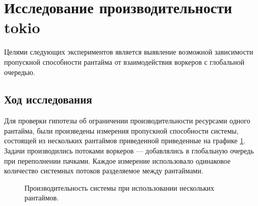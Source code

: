 
\section{Исследование производительности tokio}

Целями следующих экспериментов является выявление возможной зависимости пропускной способности рантайма от взаимодействия воркеров с глобальной очередью.

\subsection{Ход исследования}

Для проверки гипотезы об ограничении производительности ресурсами одного рантайма, были произведены измерения пропускной способности системы, состоящей из нескольких рантаймов приведенной приведенные на графике \ref{fig:tatlin:multi_rt:eval}. Задачи производились потоками воркеров --- добавлялись в глобальную очередь при переполнении пачками. Каждое измерение использовало одинаковое количество системных потоков разделяемое между рантаймами.

\begin{figure}[H]
    \begin{center}
    \end{center}

    \caption{Производительность системы при использовании нескольких рантаймов.}
    \label{fig:tatlin:multi_rt:eval}
\end{figure}

